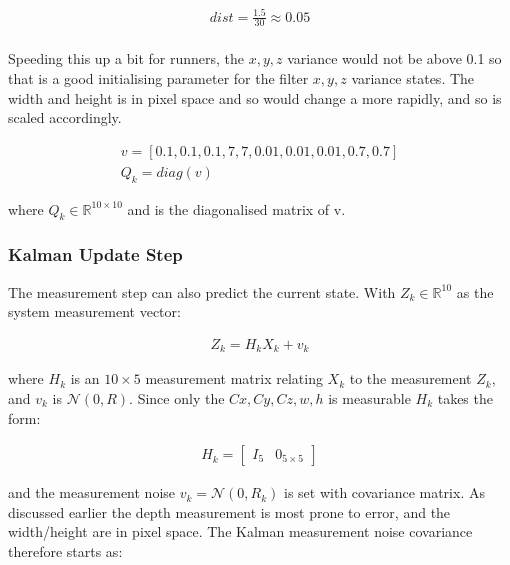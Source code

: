 \documentclass[11pt,twoside]{report}
\begin{document}
\begin{equation}
\begin{aligned}
dist = \frac{1.5}{30} \approx 0.05 \\
\end{aligned}
\end{equation}

Speeding this up a bit for runners, the $x,y,z$ variance would not be above 0.1 so that is a good initialising parameter for the filter $x,y,z$ variance states. The width and height is in pixel space and so would change a more rapidly, and so is scaled accordingly.

\begin{equation}
\begin{aligned}
v = [0.1,0.1,0.1,7,7,0.01,0.01,0.01,0.7,0.7] \\
Q_{k} = diag(v)
\end{aligned}
\end{equation}

where $Q_{k} \in \mathbb{R}^{10 \times 10}$ and is the diagonalised matrix of v.

\subsubsection{Kalman Update Step}

The measurement step can also predict the current state. With $Z_{k} \in \mathbb{R}^{10}$ as the system measurement vector:

\begin{equation}
\begin{aligned}
Z_{k} =  H_{k} X_{k} + v_{k}
\end{aligned}
\end{equation}

where $H_{k}$ is an $10 \times 5$ measurement matrix relating $X_{k}$ to the measurement $Z_{k}$, and $v_{k}$ is $\mathcal{N}(0,R)$. Since only the $Cx,Cy,Cz,w,h$ is measurable $H_{k}$ takes the form:

\begin{equation}
\begin{aligned}
H_{k} = 
\begin{bmatrix}
I_{5} &  0_{5 \times 5}
\end{bmatrix}
\end{aligned}
\end{equation}

and the measurement noise $v_{k} = \mathcal{N}(0,R_{k})$ is set with covariance matrix. As discussed earlier the depth measurement is most prone to error, and the width/height are in pixel space. The Kalman measurement noise covariance therefore starts as:
\end{document}
